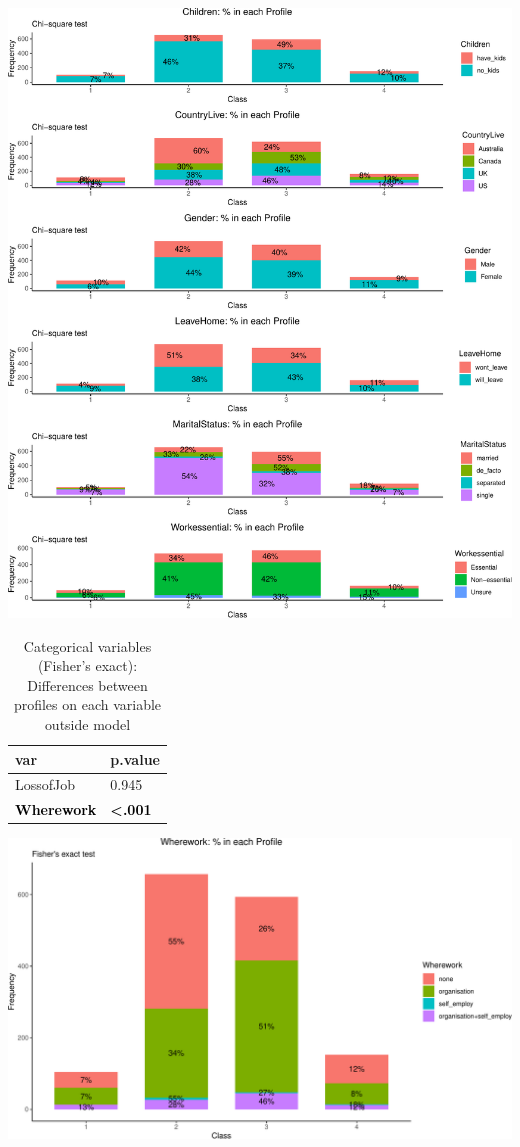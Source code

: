 \documentclass[]{article}
\begin{document}
\begin{center}\includegraphics{lpa_analyses_files/figure-latex/unnamed-chunk-27-1} \end{center}

\newpage
\begin{table}[H]

\caption{\label{tab:unnamed-chunk-28}Categorical variables (Fisher's exact): Differences between profiles on each variable outside model}
\centering
\fontsize{6}{8}\selectfont
\begin{tabular}[t]{ll}
\toprule
var & p.value\\
\midrule
LossofJob & 0.945\\
\textcolor{black}{\textbf{Wherework}} & \textcolor{black}{\textbf{<.001}}\\
\bottomrule
\end{tabular}
\end{table}

\begin{center}\includegraphics{lpa_analyses_files/figure-latex/unnamed-chunk-28-1} \end{center}
\end{document}
